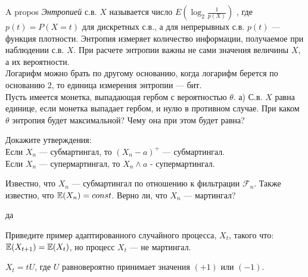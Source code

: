\begin{problem}
A propos
{\it Энтропией} с.в.  $X$  называется число $E\left(\log _{2}
\frac{1}{p\left(X\right)} \right)$ , где
$p\left(t\right)=P\left(X=t\right)$  для дискретных с.в., а для
непрерывных с.в.  $p\left(t\right)$  --- функция плотности. Энтропия
измеряет количество информации, получаемое при наблюдении с.в.
$X$. При расчете энтропии важны не сами значения величины $X$, а
их вероятности. \\
Логарифм можно брать по другому основанию, когда логарифм берется
по основанию 2, то единица измерения энтропии --- бит. \\
Пусть имеется монетка, выпадающая гербом с вероятностью  $\theta$.
а) С.в.  $X$  равна единице, если монетка выпадает гербом, и нулю
в противном случае. При каком  $\theta$  энтропия будет
максимальной? Чему она при этом будет равна? 
\end{problem} 
\begin{solution} 

\end{solution}

\begin{problem}
Докажите утверждения: \\
Если $X_{n}$ --- субмартингал, то $(X_{n}-a)^{+}$ --- субмартингал. \\
Если $X_{n}$ --- супермартингал, то $X_{n} \wedge a$ -
супермартингал. 
\end{problem} 
\begin{solution} 

\end{solution}

\begin{problem}
Известно, что $X_{n}$ --- субмартингал по отношению к фильтрации $\mathcal{F}_{n}$. Также известно, что $\mathbb{E}(X_{n})=const$. Верно ли, что $X_{n}$ --- мартингал?
\end{problem} 
\begin{solution} 
да
\end{solution}

\begin{problem}
Приведите пример адаптированного случайного процесса, $X_t$, такого что: $\mathbb{E}(X_{t+1})=\mathbb{E}(X_t)$, но процесс $X_t$ --- не мартингал.
\end{problem} 
\begin{solution} 
$X_t=tU$, где $U$ равновероятно принимает значения $(+1)$ или $(-1)$.  
\end{solution}

